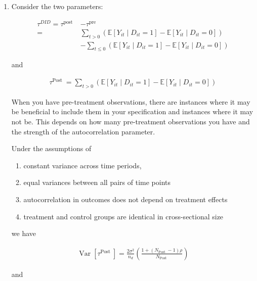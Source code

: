 \documentclass[10pt]{article}
\begin{document}
\begin{enumerate}
    \item Consider the two parameters:

        \begin{align}
                \tau^{D I D}=\tau^{\text {post }} & -\tau^{\text {pre }} \\
                = & \sum_{t>0}\left(\mathbb{E}\left[Y_{i t} \mid D_{i t}=1\right]-\mathbb{E}\left[Y_{i t} \mid D_{i t}=0\right]\right) \\
                & -\sum_{t \leq 0}\left(\mathbb{E}\left[Y_{i t} \mid D_{i t}=1\right]-\mathbb{E}\left[Y_{i t} \mid D_{i t}=0\right]\right)
        \end{align}
        
        and
        
        \begin{align}
            \tau^{\text {Post }}=\sum_{t>0}\left(\mathbb{E}\left[Y_{i t} \mid D_{i t}=1\right]-\mathbb{E}\left[Y_{i t} \mid D_{i t}=0\right]\right)
        \end{align}
        
        When you have pre-treatment observations, there are instances 
        where it may be beneficial to include them in your specification 
        and instances where it may not be. This depends on how many 
        pre-treatment observations you have and the strength of the 
        autocorrelation parameter.
        
        Under the assumptions of 
        \begin{enumerate}
            \item constant variance across time periods, 
            \item equal variances between all pairs of time points
            \item autocorrelation in outcomes does not depend on treatment effects
            \item treatment and control groups are identical in cross-sectional size
        \end{enumerate}
        
        we have 
        
        \begin{align}
            \operatorname{Var}\left[\tau^{\text {Post }}\right]=\frac{2 \sigma^2}{n_d}\left(\frac{1+\left(N_{\text {Post }}-1\right) \rho}{N_{\text {Post }}}\right)
        \end{align}
        
        and 
        

\end{enumerate}
\end{document}
